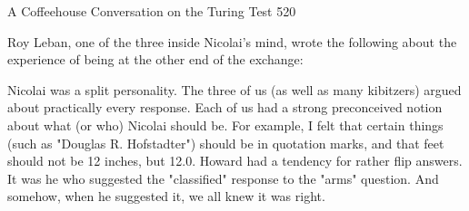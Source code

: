 A Coffeehouse Conversation on the Turing Test                                        520

       Roy Leban, one of the three inside Nicolai's mind, wrote the following about
the experience of being at the other end of the exchange:

   Nicolai was a split personality. The three of us (as well as many kibitzers)
   argued about practically every response. Each of us had a strong preconceived
   notion about what (or who) Nicolai should be. For example, I felt that certain
   things (such as "Douglas R. Hofstadter") should be in quotation marks, and that
   feet should not be 12 inches, but 12.0. Howard had a tendency for rather flip
   answers. It was he who suggested the "classified" response to the "arms"
   question. And somehow, when he suggested it, we all knew it was right.

